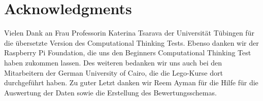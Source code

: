 \chapter{Acknowledgments}
Vielen Dank an Frau Professorin Katerina Tsarava der Universität Tübingen für die übersetzte Version des Computational Thinking Tests. Ebenso danken wir der Raspberry Pi Foundation, die uns den Beginners Computational Thinking Test haben zukommen lassen. Des weiteren bedanken wir uns auch bei den Mitarbeitern der German University of Cairo, die die Lego-Kurse dort durchgeführt haben. Zu guter Letzt danken wir Reem Ayman für die Hilfe für die Auswertung der Daten sowie die Erstellung des Bewertungsschemas.